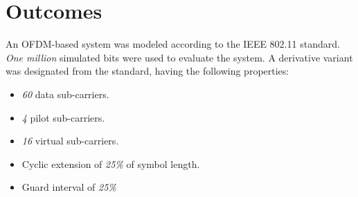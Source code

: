 \chapter{Outcomes}

An OFDM-based system was modeled according to the IEEE 802.11 standard. \emph{One million} simulated bits were used to evaluate the system. A derivative variant was designated from the standard, having the following properties:
\begin{itemize}
	\item \emph{60} data sub-carriers.
	\item \emph{4} pilot sub-carriers.
	\item \emph{16} virtual sub-carriers.
	\item Cyclic extension of \emph{25\%} of symbol length.
	\item Guard interval of \emph{25\%}
\end{itemize}






